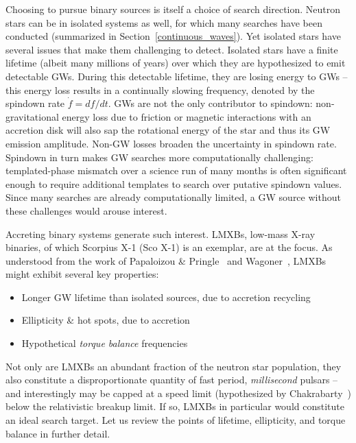 Choosing to pursue binary sources is itself a choice of search direction.
Neutron stars can be in isolated systems as well, for which many searches have been conducted (summarized in Section~\ref{continuous_waves}).
Yet isolated stars have several issues that make them challenging to detect.
Isolated stars have a finite lifetime (albeit many millions of years) over which they are hypothesized to emit detectable GWs.
During this detectable lifetime, they are losing energy to GWs -- this energy loss results in a continually slowing frequency, denoted by the spindown rate $\dot{f} = df /dt$.
GWs are not the only contributor to spindown: non-gravitational energy loss due to friction or magnetic interactions with an accretion disk will also sap the rotational energy of the star and thus its GW emission amplitude.
Non-GW losses broaden the uncertainty in spindown rate.
Spindown in turn makes GW searches more computationally challenging: templated-phase mismatch over a science run of many months is often significant enough to require additional templates to search over putative spindown values. 
Since many searches are already computationally limited, a GW source without these challenges would arouse interest.

Accreting binary systems generate such interest.
LMXBs, low-mass X-ray binaries, of which Scorpius X-1 (Sco X-1) is an exemplar, are at the focus.
As understood from the work of Papaloizou \& Pringle~\cite{PapaloizouPringle1978} and Wagoner~\cite{Wagoner1984}, LMXBs might exhibit several key properties:

\begin{itemize}
\item Longer GW lifetime than isolated sources, due to accretion recycling
\item Ellipticity \& hot spots, due to accretion
\item Hypothetical \textit{torque balance} frequencies
\end{itemize}

Not only are LMXBs an abundant fraction of the neutron star population, they also constitute a disproportionate quantity of fast period, \textit{millisecond} pulsars -- and interestingly may be capped at a speed limit (hypothesized by Chakrabarty~\cite{Chakrabarty2003}) below the relativistic breakup limit.
If so, LMXBs in particular would constitute an ideal search target.
Let us review the points of lifetime, ellipticity, and torque balance in further detail.



